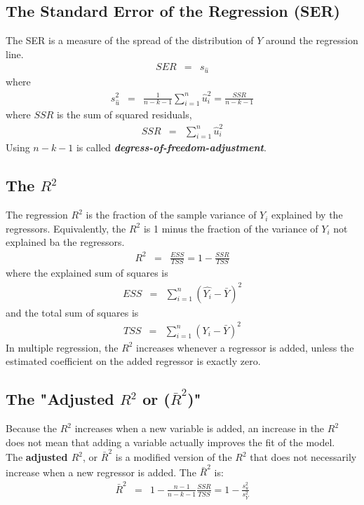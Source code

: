 \subsection{The Standard Error of the Regression (SER)}
The SER is a measure of the spread of the distribution of $Y$ around the regression line.
\begin{eqnarray}
SER &=& s_{\hat{u}}
\end{eqnarray}
where
\begin{eqnarray}
s_{\hat{u}}^{2} &=& \frac{1}{n - k - 1}\sum_{i = 1}^{n}\hat{u}_{i}^{2} = \frac{SSR}{n - k - 1} 
\end{eqnarray}
where $SSR$ is the sum of squared residuals,
\begin{eqnarray}
SSR &=& \sum_{i = 1}^{n}\hat{u}_{i}^{2}
\end{eqnarray}
Using $n - k - 1$ is called \textit{\color{blue}\textbf{degress-of-freedom-adjustment}}.

\subsection{The \texorpdfstring{$R^{2}$}{R2}}
The regression $R^{2}$ is the fraction of the sample variance of $Y_{i}$ explained by the regressors. Equivalently, the $R^{2}$ is 1 minus the fraction of the variance of $Y_{i}$ not explained ba the regressors.
\begin{eqnarray}
R^{2} &=& \frac{ESS}{TSS} = 1 - \frac{SSR}{TSS}
\end{eqnarray}
where the explained sum of squares is
\begin{eqnarray}
	ESS &=& \sum_{i = 1}^{n}\left(\hat{Y_{i}} - \bar{Y}\right)^{2}
\end{eqnarray}
and the total sum of squares is
\begin{eqnarray}
	TSS &=& \sum_{i = 1}^{n}\left(Y_{i} - \bar{Y}\right)^{2}
\end{eqnarray}
In multiple regression, the $R^{2}$ increases whenever a regressor is added, unless the estimated coefficient on the added regressor is exactly zero.

\subsection{The "Adjusted \texorpdfstring{$R^{2}$}{R2} or (\texorpdfstring{$\bar{R}^{2}$}{2})"}
Because the $R^{2}$ increases when a new variable is added, an increase in the $R^{2}$ does not mean that adding a variable actually improves the fit of the model.\\
The \textbf{adjusted $R^{2}$}, or $\bar{R}^{2}$ is a modified version of the $R^{2}$ that does not necessarily increase when a new regressor is added. The $\bar{R}^{2}$ is:
\begin{eqnarray}
	\bar{R}^{2} &=& 1 - \frac{n - 1}{n - k -1}\frac{SSR}{TSS} = 1 - \frac{s_{u}^{2}}{s_{Y}^{2}}
\end{eqnarray}

